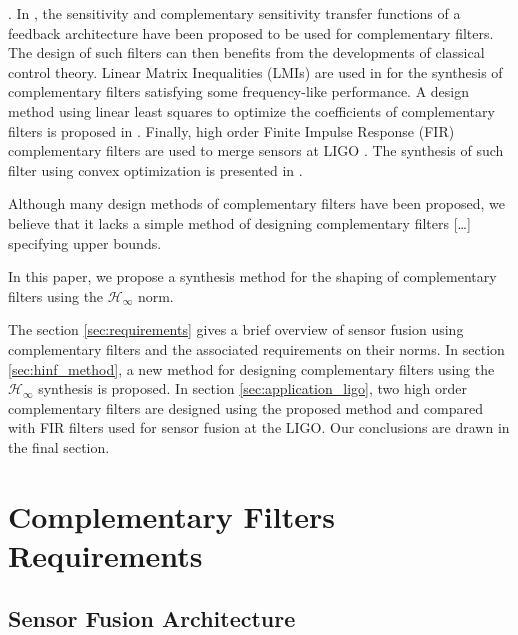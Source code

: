 \documentclass[letterpaper, 10 pt, conference]{ieeeconf}
\begin{document}
\cite{shaw90_bandw_enhan_posit_measur_using_measur_accel,zimmermann92_high_bandw_orien_measur_contr,collette15_sensor_fusion_method_high_perfor}.
In \cite{jensen13_basic_uas}, the sensitivity and complementary sensitivity transfer functions of a feedback architecture have been proposed to be used for complementary filters. The design of such filters can then benefits from the developments of classical control theory.
Linear Matrix Inequalities (LMIs) are used in \cite{pascoal99_navig_system_desig_using_time} for the synthesis of complementary filters satisfying some frequency-like performance.
A design method using linear least squares to optimize the coefficients of complementary filters is proposed in \cite{min15_compl_filter_desig_angle_estim}.
Finally, high order Finite Impulse Response (FIR) complementary filters are used to merge sensors at LIGO \cite{hua05_low_ligo,hua04_polyp_fir_compl_filter_contr_system,matichard15_seism_isolat_advan_ligo}. The synthesis of such filter using convex optimization is presented in \cite{hua05_low_ligo}. \par
Although many design methods of complementary filters have been proposed, we believe that it lacks a simple method of designing complementary filters [\ldots{}] specifying upper bounds.\par
In this paper, we propose a synthesis method for the shaping of complementary filters using the \(\mathcal{H}_\infty\) norm.\par
The section \ref{sec:requirements} gives a brief overview of sensor fusion using complementary filters and the associated requirements on their norms.
In section \ref{sec:hinf_method}, a new method for designing complementary filters using the \(\mathcal{H}_\infty\) synthesis is proposed.
In section \ref{sec:application_ligo}, two high order complementary filters are designed using the proposed method and compared with FIR filters used for sensor fusion at the LIGO.
Our conclusions are drawn in the final section.

\section{Complementary Filters Requirements}
\label{sec:org8f2a1a9}
\label{sec:requirements}
\subsection{Sensor Fusion Architecture}
\label{sec:org202d271}
\label{sec:sensor_fusion}
\end{document}
